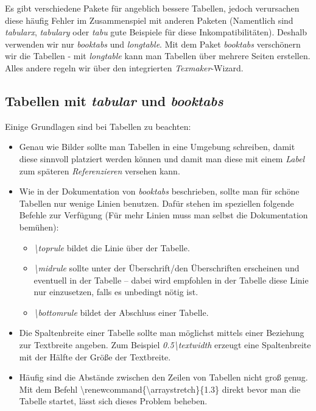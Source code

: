 Es gibt verschiedene Pakete für angeblich bessere Tabellen, jedoch verursachen diese häufig Fehler im Zusammenspiel mit anderen Paketen (Namentlich sind \emph{tabularx}, \emph{tabulary} oder \emph{tabu} gute Beispiele für diese Inkompatibilitäten). Deshalb verwenden wir nur \emph{booktabs} und \emph{longtable}. Mit dem Paket \emph{booktabs} verschönern wir die Tabellen - mit \emph{longtable} kann man Tabellen über mehrere Seiten erstellen. Alles andere regeln wir über den integrierten \emph{Texmaker}-Wizard.%
\subsection{Tabellen mit \emph{tabular} und \emph{booktabs}}%
Einige Grundlagen sind bei Tabellen zu beachten:\\%
\begin{itemize}%
\item Genau wie Bilder sollte man Tabellen in eine Umgebung schreiben, damit diese sinnvoll platziert werden können und damit man diese mit einem \emph{Label} zum späteren \emph{Referenzieren} versehen kann.%
\item Wie in der Dokumentation von \emph{booktabs} beschrieben, sollte man für schöne Tabellen nur wenige Linien benutzen. Dafür stehen im speziellen folgende Befehle zur Verfügung (Für mehr Linien muss man selbst die Dokumentation bemühen):%
	\begin{itemize}%
	\item \emph{\textbackslash toprule} bildet die Linie über der Tabelle.%
	\item \emph{\textbackslash midrule} sollte unter der Überschrift/den Überschriften erscheinen und eventuell in der Tabelle -- dabei wird empfohlen in der Tabelle diese Linie nur einzusetzen, falls es unbedingt nötig ist.%
	\item \emph{\textbackslash bottomrule} bildet der Abschluss einer Tabelle.%
	\end{itemize}%
\item Die Spaltenbreite einer Tabelle sollte man möglichst mittels einer Beziehung zur Textbreite angeben. Zum Beispiel \emph{0.5\textbackslash textwidth} erzeugt eine Spaltenbreite mit der Hälfte der Größe der Textbreite.%
\item Häufig sind die Abstände zwischen den Zeilen von Tabellen nicht groß genug. Mit dem Befehl \textbackslash renewcommand\{\textbackslash arraystretch\}\{1.3\} direkt bevor man die Tabelle startet, lässt sich dieses Problem beheben.
\end{itemize}%

